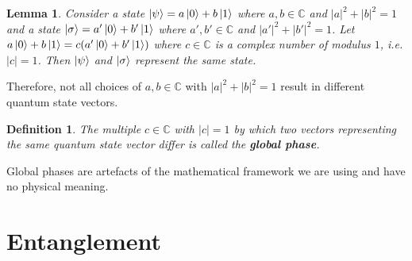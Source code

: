 \documentclass[12pt,twoside,fleqn]{report}
\theoremstyle{thmstyle}
\newtheorem{defn}{Definition}[chapter]
\newtheorem{lemma}{Lemma}[chapter]
\begin{document}
\begin{samepage}
\begin{lemma}
Consider a state $\ket{\psi} = a \ket{0} + b \ket{1}$ where $a,b \in \mathbb{C}$ and $|a|^2 + |b|^2 = 1$ and a state $\ket{\sigma} = a' \ket{0} + b' \ket{1}$ where $a',b' \in \mathbb{C}$ and $|a'|^2 + |b'|^2 = 1$. Let $a \ket{0} + b \ket{1} = c (a' \ket{0} + b' \ket{1})$ where $c \in \mathbb{C}$ is a complex number of modulus $1$, i.e. $|c| = 1$. Then $\ket\psi$ and $\ket\sigma$ represent the same state.
\end{lemma}

Therefore, not all choices of $a, b \in \mathbb{C}$ with $|a|^2 + |b|^2 = 1$ result in different quantum state vectors. 
\begin{defn}
The multiple $c \in \mathbb{C}$ with $|c| = 1$ by which two vectors representing the same quantum state vector differ is called the \textbf{global phase}. 
\end{defn}
Global phases are artefacts of the mathematical framework we are using and have no physical meaning.
\end{samepage}



\pagebreak
\section{Entanglement}

\begin{comment}
x notation for tensor product of vectors
x Simple notation
x properties of tensor product of vectors
* orthonormal basis for tensor product space
* Inner product defined on space of tensor products of vectors
* Definition of tensor product of spaces -- Hilbert space
* Notation for tensor product of spaces
* Tensor product multiplication rules
* Principle of Entanglement
* Proof that most states are entangled
\end{comment}
\end{document}
